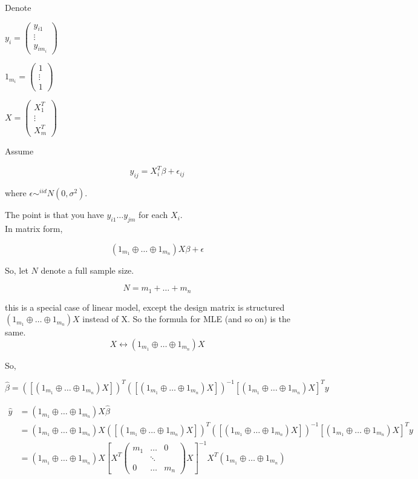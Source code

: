 \documentclass[11pt,fleqn]{book} %
\begin{document}
Denote 

$y_i = \begin{pmatrix}
	y_{i1}\\
	\vdots\\
	y_{im_i}
\end{pmatrix}$

$1_{m_i} = \begin{pmatrix}
	1 \\
	\vdots\\
	1
\end{pmatrix}$

$X = \begin{pmatrix}
	X_{1}^T\\
	\vdots\\
	X_{m}^T
\end{pmatrix}$

Assume

$$y_{ij} = X_i^T \beta + \epsilon_{ij} $$

where $\epsilon \sim^{iid} N(0, \sigma^2)$. 

The point is that you have $y_{i1} \dots y_{jm}$ for each $X_i$.\\

In matrix form, 


$$(1_{m_1} \oplus \dots \oplus 1_{m_n}) X\beta + \epsilon $$

So, let $N$ denote a full sample size. 

$$N = m_1 + \dots + m_n$$

this is a special case of linear model, except the design matrix is structured $(1_{m_1} \oplus \dots \oplus 1_{m_n})X $ instead of X. So the formula for MLE (and so on) is the same. \\

$$X \leftrightarrow (1_{m_1} \oplus \dots \oplus 1_{m_n})X$$

So, 

$$\hat{\beta} = ([(1_{m_1} \oplus \dots \oplus 1_{m_n})X])^T ([(1_{m_1} \oplus \dots \oplus 1_{m_n})X])^{-1} [(1_{m_1} \oplus \dots \oplus 1_{m_n})X]^T y$$

\begin{align*}
\hat{y} &= (1_{m_1} \oplus \dots \oplus 1_{m_n})X \hat{\beta} \\
	&= (1_{m_1} \oplus \dots \oplus 1_{m_n})X ([(1_{m_1} \oplus \dots \oplus 1_{m_n})X])^T ([(1_{m_1} \oplus \dots \oplus 1_{m_n})X])^{-1} [(1_{m_1} \oplus \dots \oplus 1_{m_n})X]^T y\\
	&=  (1_{m_1} \oplus \dots \oplus 1_{m_n})X [X^T \begin{pmatrix}
		m_1 & \dots & 0\\
		  & \ddots  & \\
		  0 & \dots & m_n
	\end{pmatrix} 	X]^{-1} X^T (1_{m_1} \oplus \dots \oplus 1_{m_n})	
\end{align*}
\end{document}
